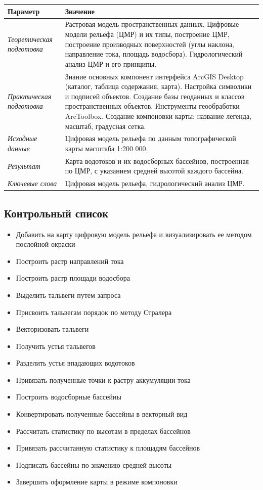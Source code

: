 \documentclass[]{book}
\providecommand{\tightlist}{%
  \setlength{\itemsep}{0pt}\setlength{\parskip}{0pt}}
\theoremstyle{definition}
\theoremstyle{definition}
\theoremstyle{definition}
\theoremstyle{remark}
\begin{document}
\begin{longtable}[]{@{}ll@{}}
\toprule
Параметр & Значение\tabularnewline
\midrule
\endhead
\emph{Теоретическая подготовка} & Растровая модель пространственных
данных. Цифровые модели рельефа (ЦМР) и их типы, построение ЦМР,
построение производных поверхностей (углы наклона, направление тока,
площадь водосбора). Гидрологический анализ ЦМР и его
принципы.\tabularnewline
\emph{Практическая подготовка} & Знание основных компонент интерфейса
ArcGIS Desktop (каталог, таблица содержания, карта). Настройка символики
и подписей объектов. Создание базы геоданных и классов пространственных
объектов. Инструменты геообработки ArcToolbox. Создание компоновки
карты: название легенда, масштаб, градусная сетка.\tabularnewline
\emph{Исходные данные} & Цифровая модель рельефа по данным
топографической карты масштаба 1:200 000.\tabularnewline
\emph{Результат} & Карта водотоков и их водосборных бассейнов,
построенная по ЦМР, с указанием средней высотой каждого
бассейна.\tabularnewline
\emph{Ключевые слова} & Цифровая модель рельефа, гидрологический анализ
ЦМР.\tabularnewline
\bottomrule
\end{longtable}

\hypertarget{dem-control}{%
\subsection{Контрольный список}\label{dem-control}}

\begin{itemize}
\tightlist
\item
  Добавить на карту цифровую модель рельефа и визуализировать ее методом
  послойной окраски
\item
  Построить растр направлений тока
\item
  Построить растр площади водосбора
\item
  Выделить тальвеги путем запроса
\item
  Присвоить тальвегам порядок по методу Стралера
\item
  Векторизовать тальвеги
\item
  Получить устья тальвегов
\item
  Разделить устья впадающих водотоков
\item
  Привязать полученные точки к растру аккумуляции тока
\item
  Построить водосборные бассейны
\item
  Конвертировать полученные бассейны в векторный вид
\item
  Рассчитать статистику по высотам в пределах бассейнов
\item
  Привязать рассчитанную статистику к площадям бассейнов
\item
  Подписать бассейны по значению средней высоты
\item
  Завершить оформление карты в режиме компоновки
\end{itemize}
\end{document}
